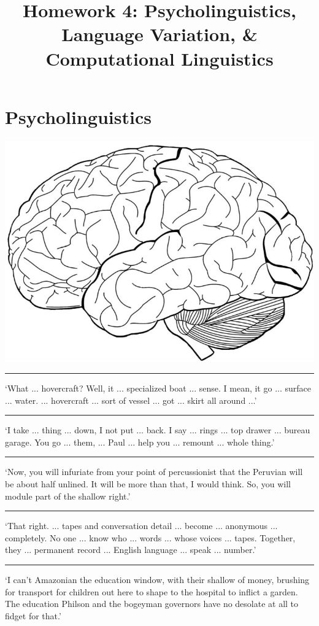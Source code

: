 \documentclass[addpoints]{exam}
\title{Homework 4: Psycholinguistics, Language Variation, \& Computational Linguistics}
\date{}
\begin{document}
  \maketitle

  

    \section{Psycholinguistics}
  \begin{questions}
        \question[4]
          \includegraphics{brain_unlabelled.jpg}

        \question[1] \rule{4cm}{0.4pt} `What ... hovercraft? Well, it ... specialized boat ... sense. I mean, it go ... surface ... water. ... hovercraft ... sort of vessel ... got ... skirt all around ...'
        \question[1] \rule{4cm}{0.4pt} `I take ... thing ... down, I not put ... back. I say ... rings ... top drawer ... bureau garage. You go ... them, ... Paul ... help you ... remount ... whole thing.'
        \question[1] \rule{4cm}{0.4pt} `Now, you will infuriate from your point of percussionist that the Peruvian will be about half unlined. It will be more than that, I would think. So, you will module part of the shallow right.'
        \question[1] \rule{4cm}{0.4pt} `That right. ... tapes and conversation detail ... become ... anonymous ... completely. No one ... know who ... words ... whose voices ... tapes. Together, they ... permanent record ... English language ... speak ... number.'
        \question[1] \rule{4cm}{0.4pt} `I can't Amazonian the education window, with their shallow of money, brushing for transport for children out here to shape to the hospital to inflict a garden. The education Philson and the bogeyman governors have no desolate at all to fidget for that.'


\end{questions}
\end{document}
